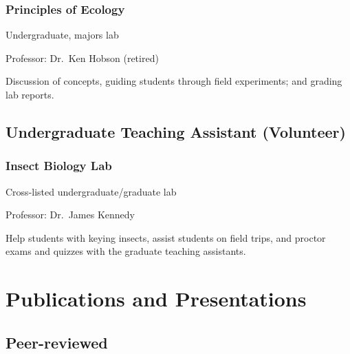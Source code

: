 \documentclass[
  letterpaper,
  DIV=11,
  numbers=noendperiod,
  oneside]{scrreprt}
\begin{document}
\subsection{Principles of Ecology}\label{sec-teach-ecology}

Undergraduate, majors lab


Professor: Dr.~Ken Hobson (retired)

Discussion of concepts, guiding students through field experiments; and
grading lab reports.

\section{Undergraduate Teaching Assistant
(Volunteer)}\label{undergraduate-teaching-assistant-volunteer}

\subsection{Insect Biology Lab}\label{insect-biology-lab}

Cross-listed undergraduate/graduate lab


Professor: Dr.~James Kennedy

Help students with keying insects, assist students on field trips, and
proctor exams and quizzes with the graduate teaching assistants.


\chapter{Publications and
Presentations}\label{publications-and-presentations}

\section{Peer-reviewed}\label{sec-peer}
\end{document}
